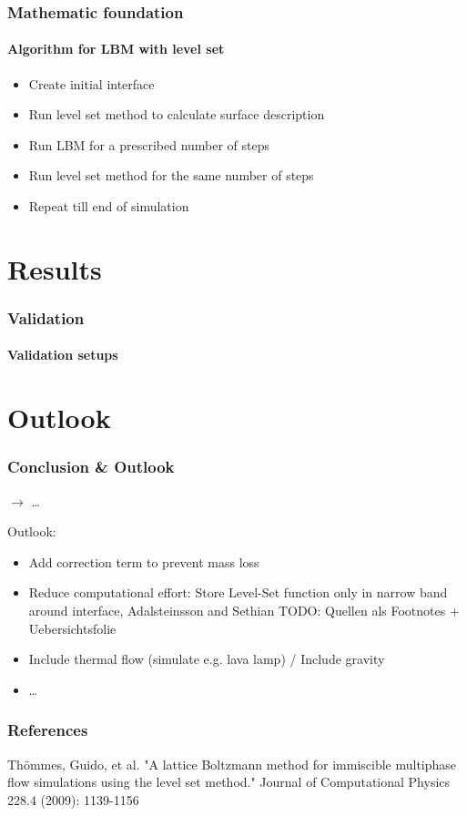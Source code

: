 \documentclass[ucs]{beamer}
\begin{document}
\begin{frame}
\frametitle{Mathematic foundation}
\framesubtitle{Algorithm for LBM with level set}
\begin{itemize}
\item<1-> Create initial interface
\item<2-> Run level set method to calculate surface description
\item<3-> Run LBM for a prescribed number of steps
\item<4-> Run level set method for the same number of steps
\item<5-> Repeat till end of simulation
\end{itemize}
\end{frame}

\section{Results}
\begin{frame}
\frametitle{Validation}
\framesubtitle{Validation setups}
\end{frame}

\section{Outlook}
\begin{frame}
\frametitle{Conclusion \& Outlook}
$\rightarrow$ \dots

\vspace{.8cm}
Outlook:
\begin{itemize}
\item<1-> Add correction term to prevent mass loss
\item<1-> Reduce computational effort: Store Level-Set function only in narrow band around interface, Adalsteinsson and Sethian
TODO: Quellen als Footnotes + Uebersichtsfolie
\item<2-> Include thermal flow (simulate e.g. lava lamp) / Include gravity
\item<3-> \dots
\end{itemize}

\end{frame}

\begin{frame}
\frametitle{References}
\begin{thebibliography}{etw}
     Thömmes, Guido, et al. "A lattice Boltzmann method for immiscible multiphase flow simulations using the level set method." Journal of Computational Physics 228.4 (2009): 1139-1156
\end{thebibliography}
\end{frame}
\end{document}
